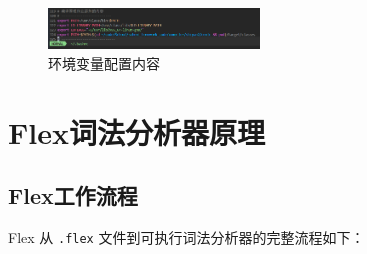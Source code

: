\documentclass[twocolumn]{article}
\begin{document}
\begin{figure}[H]
    \centering
    \includegraphics[width=0.5\textwidth]{env.png}
    \caption{环境变量配置内容}
    \label{fig:env_config}
\end{figure}

\section{Flex词法分析器原理}
\subsection{Flex工作流程}
Flex 从 \texttt{.flex} 文件到可执行词法分析器的完整流程如下：
\end{document}
